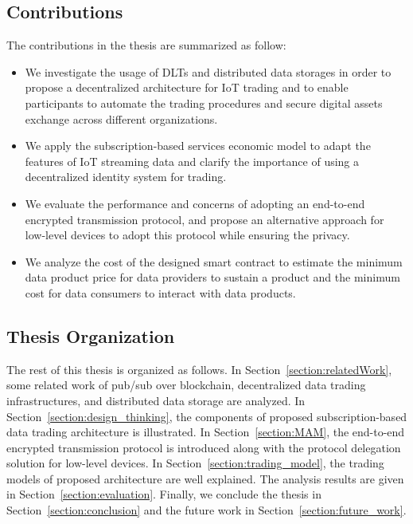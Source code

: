 \documentclass[conference]{IEEEtran}
\begin{document}
\subsection{Contributions}
The contributions in the thesis are summarized as follow:
\begin{itemize}
    \item We investigate the usage of DLTs and distributed data storages in order to propose a decentralized architecture for IoT trading and to enable participants to automate the trading procedures and secure digital assets exchange across different organizations.
    \item We apply the subscription-based services economic model to adapt the features of IoT streaming data and clarify the importance of using a decentralized identity system for trading.
    \item We evaluate the performance and concerns of adopting an end-to-end encrypted transmission protocol, and propose an alternative approach for low-level devices to adopt this protocol while ensuring the privacy.
    \item We analyze the cost of the designed smart contract to estimate the minimum data product price for data providers to sustain a product and the minimum cost for data consumers to interact with data products.
\end{itemize}


\subsection{Thesis Organization}
The rest of this thesis is organized as follows. In Section~\ref{section:relatedWork}, some related work of pub/sub over blockchain, decentralized data trading infrastructures, and distributed data storage are analyzed. In Section~\ref{section:design_thinking}, the components of proposed subscription-based data trading architecture is illustrated. In Section~\ref{section:MAM}, the end-to-end encrypted transmission protocol is introduced along with the protocol delegation solution for low-level devices. In Section~\ref{section:trading_model}, the trading models of proposed architecture are well explained. The analysis results are given in Section~\ref{section:evaluation}. Finally, we conclude the thesis in Section~\ref{section:conclusion} and the future work in Section~\ref{section:future_work}.
\end{document}
